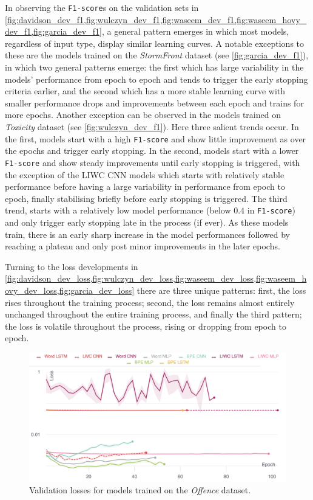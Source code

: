 In observing the \texttt{F1-score}s on the validation sets in \cref{fig:davidson_dev_f1,fig:wulczyn_dev_f1,fig:waseem_dev_f1,fig:waseem_hovy_dev_f1,fig:garcia_dev_f1}, a general pattern emerges in which most models, regardless of input type, display similar learning curves.
A notable exceptions to these are the models trained on the \textit{StormFront} dataset (see \cref{fig:garcia_dev_f1}), in which two general patterns emerge: the first which has large variability in the models' performance from epoch to epoch and tends to trigger the early stopping criteria earlier, and the second which has a more stable learning curve with smaller performance drops and improvements between each epoch and trains for more epochs.
Another exception can be observed in the models trained on \textit{Toxicity} dataset (see \cref{fig:wulczyn_dev_f1}). Here three salient trends occur.
In the first, models start with a high \texttt{F1-score} and show little improvement as over the epochs and trigger early stopping.
In the second, models start with a lower \texttt{F1-score} and show steady improvements until early stopping is triggered,
with the exception of the LIWC CNN models which starts with relatively stable performance before having a large variability in performance from epoch to epoch, finally stabilising briefly before early stopping is triggered.
The third trend, starts with a relatively low model performance (below $0.4$ in \texttt{F1-score}) and only trigger early stopping late in the process (if ever). As these models train, there is an early sharp increase in the model performances followed by reaching a plateau and only post minor improvements in the later epochs.

Turning to the loss developments in \cref{fig:davidson_dev_loss,fig:wulczyn_dev_loss,fig:waseem_dev_loss,fig:waseem_hovy_dev_loss,fig:garcia_dev_loss} there are three unique patterns: first, the loss rises throughout the training process; second, the loss remains almost entirely unchanged throughout the entire training process, and finally the third pattern; the loss is volatile throughout the process, rising or dropping from epoch to epoch.


\begin{figure}
    \centering
    \includegraphics[width=\textwidth]{davidson_dev_loss_stderr_logscale.pdf}
    \caption{Validation losses for models trained on the \textit{Offence} dataset.}
    \label{fig:davidson_dev_loss}
\end{figure}

